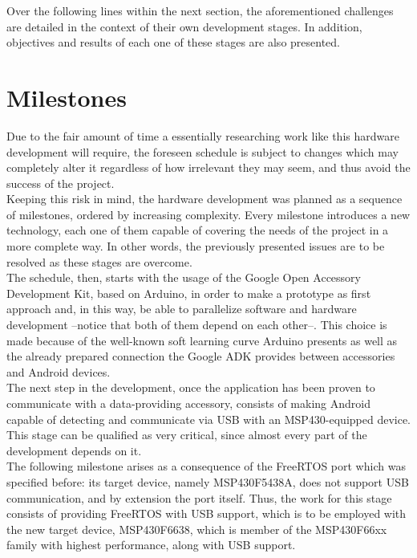 	Over the following lines within the next section, the aforementioned challenges are detailed
	in the context of their own development stages. In addition, objectives and results of each one of
	these stages are also presented.
	
	\section{Milestones}	
	Due to the fair amount of time a essentially researching work like this hardware development will
	require, the foreseen schedule is subject to changes which may completely alter it regardless of 
	how irrelevant they may seem, and thus avoid the success of the project.\\
	
	Keeping this risk in mind, the hardware development was planned as a sequence of milestones,
	ordered by increasing complexity. Every milestone introduces a new technology, each one of them
	capable of covering the needs of the project in a more complete way. In other words, the previously
	presented issues are to be resolved as these stages are overcome.\\
	
	The schedule, then, starts with the usage of the Google Open Accessory Development Kit, based on Arduino,
	in order to make a prototype as first approach and, in this way, be able to parallelize software and
	hardware development --notice that both of them depend on each other--. This choice is made because of
	the well-known soft learning curve Arduino presents as well as the already prepared connection
	the Google ADK provides between accessories and Android devices.\\
	
	The next step in the development, once the application has been proven to communicate with a data-providing
	accessory, consists of making Android capable of detecting and communicate via USB with an MSP430-equipped
	device. This stage can be qualified as very critical, since almost every part of the development
	depends on it.\\
	
	The following milestone arises as a consequence of the FreeRTOS port which was specified before: its
	target device, namely MSP430F5438A, does not support USB communication, and by extension the port itself.
	Thus, the work for this stage consists of providing FreeRTOS with USB support, which is to be employed
	with the new target device, MSP430F6638, which is member of the MSP430F66xx family with highest performance,
	along with USB support.\\
	
